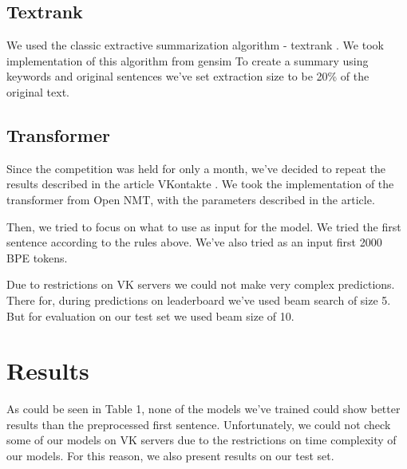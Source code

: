 \documentclass{dialogue}
\begin{document}
\subsection{Textrank}

We used the classic extractive summarization algorithm - textrank \cite{DBLP:journals/corr/BarriosLAW16}. We took implementation of this algorithm from gensim \cite{rehurek_lrec} To create a summary using keywords and original sentences we've set extraction size to be 20\% of the original text.

\subsection{Transformer}

Since the competition was held for only a month, we've decided to repeat the results described in the article VKontakte \cite{gavrilov2018self}. We took the implementation of the transformer from Open NMT, with the parameters described in the article.

Then, we tried to focus on what to use as input for the model. We tried the first sentence according to the rules above. We've also tried as an input first 2000 BPE tokens.

Due to restrictions on VK servers we could not make very complex predictions. There for, during predictions on leaderboard we've used beam search of size 5. But for evaluation on our test set we used beam size of 10.

\section{Results}

As could be seen in Table 1, none of the models we've trained could show better results than the preprocessed first sentence. Unfortunately, we could not check some of our models on VK servers due to the restrictions on time complexity of our models. For this reason, we also present results on our test set.
\end{document}
